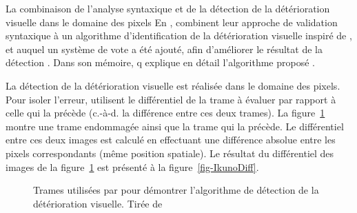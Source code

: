 \begin{section}{La combinaison de l'analyse syntaxique et de la
détection de la détérioration visuelle dans le domaine des pixels}
\label{sect-Combined}
En \citeyear{Superiori2007}, \citeauthor{Superiori2007} combinent leur approche
de validation syntaxique à un algorithme d'identification de la détérioration
visuelle inspiré de \citet{Ye2003}, et auquel un système de vote a été ajouté,
afin d'améliorer le résultat de la détection \citep{Superiori2007}. Dans son
mémoire, \citeauthor{Ikuno2007}q explique en détail l'algorithme proposé
\citep{Ikuno2007}.

La détection de la détérioration visuelle est réalisée dans le domaine des
pixels. Pour isoler l'erreur, \citeauthor{Superiori2007} utilisent le
différentiel de la trame à évaluer par rapport à celle qui la précède (c.-à-d.
la différence entre ces deux trames). La figure~\ref{fig-IkunoForeman} montre
une trame endommagée ainsi que la trame qui la précède. Le différentiel entre
ces deux images est calculé en effectuant une différence absolue entre les
pixels correspondants (même position spatiale). Le résultat du différentiel des
images de la figure~\ref{fig-IkunoForeman} est présenté à la
figure~\ref{fig-IkunoDiff}.

\begin{figure}
	\caption[Trames utilisées par \citeauthor{Ikuno2007} pour son algorithme
détection]{Trames utilisées par \citeauthor{Ikuno2007} pour démontrer
l'algorithme de détection de la détérioration visuelle. Tirée de
\citet[p.~25]{Ikuno2007}}
	\label{fig-IkunoForeman}
\end{figure}


\end{section}

